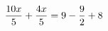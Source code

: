 \documentclass[preview]{standalone}
\begin{document}
\begin{align*}
\special{dvisvgm:raw <g id='unique000'>}\frac{10 x}{5} + \frac{4 x}{5} = 9 - \frac{9}{2} + 8\special{dvisvgm:raw </g>}
\end{align*}
\end{document}
